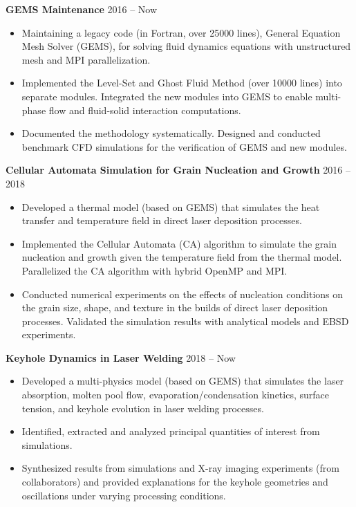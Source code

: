 \documentclass[12pt, letterpaper]{article}
\begin{document}
\textbf{GEMS Maintenance} \hfill 2016 -- Now
\begin{itemize}[leftmargin=*, labelsep=5mm]
   \item Maintaining a legacy code (in Fortran, over 25000 lines), General Equation Mesh Solver
      (GEMS), for solving fluid dynamics equations with unstructured mesh and MPI parallelization.
   \item Implemented the Level-Set and Ghost Fluid Method (over 10000 lines) into separate modules.
      Integrated the new modules into GEMS to enable multi-phase flow and fluid-solid interaction
      computations.
   \item Documented the methodology systematically. Designed and conducted benchmark CFD
      simulations for the verification of GEMS and new modules.
\end{itemize}

\vspace{3pt}

\textbf{Cellular Automata Simulation for Grain Nucleation and Growth} \hfill 2016 -- 2018
\begin{itemize}[leftmargin=*, labelsep=5mm]
   \item Developed a thermal model (based on GEMS) that simulates the heat transfer and
      temperature field in direct laser deposition processes.
   \item Implemented the Cellular Automata (CA) algorithm to simulate the grain nucleation and
      growth given the temperature field from the thermal model. Parallelized the CA algorithm with
      hybrid OpenMP and MPI.
   \item Conducted numerical experiments on the effects of nucleation conditions on the grain size,
      shape, and texture in the builds of direct laser deposition processes. Validated the simulation
      results with analytical models and EBSD experiments.
\end{itemize}

\vspace{3pt}

\textbf{Keyhole Dynamics in Laser Welding} \hfill 2018 -- Now
\begin{itemize}[leftmargin=*, labelsep=5mm]
   \item Developed a multi-physics model (based on GEMS) that simulates the laser absorption, molten
      pool flow, evaporation/condensation kinetics, surface tension, and keyhole evolution in laser
      welding processes.
   \item Identified, extracted and analyzed principal quantities of interest from simulations.
   \item Synthesized results from simulations and X-ray imaging experiments (from collaborators) and
      provided explanations for the keyhole geometries and oscillations under varying processing
      conditions.
\end{itemize}
\end{document}
